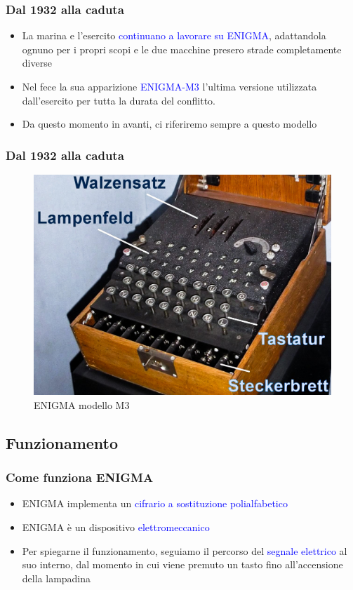 	\begin{frame}
		\frametitle{Dal 1932 alla caduta}		
		\begin{itemize}
			\item La marina e l'esercito \textcolor{blue}{continuano a lavorare su ENIGMA}, adattandola ognuno per i propri scopi e le due macchine presero strade completamente diverse
			\item Nel  fece la sua apparizione \textcolor{blue}{ENIGMA-M3} l'ultima versione utilizzata dall'esercito per tutta la durata del conflitto.
			\item Da questo momento in avanti, ci riferiremo sempre a questo modello
		\end{itemize}
	\end{frame}
	
	\begin{frame}
		\frametitle{Dal 1932 alla caduta}		
		\begin{figure} [h]
			\centering
			\includegraphics[scale = 0.5]{img/M3}
			\caption{ENIGMA modello M3}
		\end{figure}
	\end{frame}
	
	\subsection{Funzionamento}
	
	\begin{frame}
		\frametitle{Come funziona ENIGMA}
		\begin{itemize}
			\item ENIGMA implementa un \textcolor{blue}{cifrario a sostituzione polialfabetico}
			\item ENIGMA è un dispositivo \textcolor{blue}{elettromeccanico}
			\item Per spiegarne il funzionamento, seguiamo il percorso del \textcolor{blue}{segnale elettrico} al suo interno, dal momento in cui viene premuto un tasto fino all'accensione della lampadina
		\end{itemize}
	\end{frame}
	
